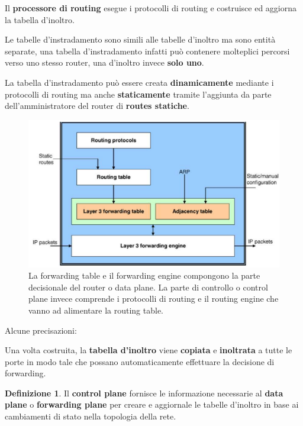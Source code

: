 \documentclass[11pt,a4paper,oneside]{book}
\theoremstyle{definition}
\newtheorem{definition}{Definizione}[section]
\begin{document}
\begin{itemize}
	      Il \textbf{processore di routing} esegue i protocolli di routing e costruisce ed aggiorna la tabella d'inoltro.

	      Le tabelle d'instradamento sono simili alle tabelle d'inoltro ma sono entità separate, una tabella d'instradamento infatti può contenere molteplici percorsi verso uno stesso router, una d'inoltro invece \textbf{solo uno}.

	      La tabella d'instradamento può essere creata \textbf{dinamicamente} mediante i protocolli di routing ma anche \textbf{staticamente} tramite l'aggiunta da parte dell'amministratore del router di \textbf{routes statiche}.

\end{itemize}

\begin{figure}[!h]
	\includegraphics[scale=0.6]{Immagini/Forw_tab2.png}
	\centering
	\caption{La forwarding table e il forwarding engine compongono la parte decisionale del router o data plane. La parte di controllo o control plane invece comprende i protocolli di routing e il routing engine che vanno ad alimentare la routing table.}
\end{figure}

\begin{flushleft}
	Alcune precisazioni:
\end{flushleft}

Una volta costruita, la \textbf{tabella d'inoltro} viene \textbf{copiata} e \textbf{inoltrata} a tutte le porte in modo tale che possano automaticamente effettuare la decisione di forwarding.

\theoremstyle{definition}
\begin{definition}
	Il \textbf{control plane} fornisce le informazione necessarie al \textbf{data plane} o \textbf{forwarding plane} per creare e aggiornale le tabelle d'inoltro in base ai cambiamenti di stato nella topologia della rete.
\end{definition}
\end{document}
